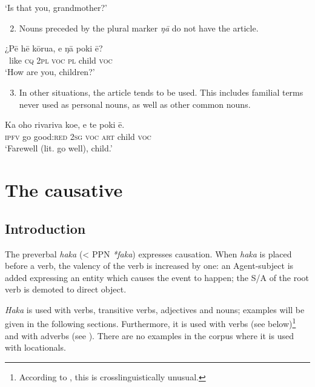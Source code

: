 \glt
‘Is that you, grandmother?’ \textstyleExampleref{[R313.119]} 
\z

\begin{enumerate}
\setcounter{enumi}{1}
\item 
Nouns preceded by the plural marker \textit{ŋā} do not have the article.
\end{enumerate}

\ea\label{ex:8.218}
\gll ¿Pē hē kōrua, e ŋā poki ē?\\
~like \textsc{cq} \textsc{2pl} \textsc{voc} \textsc{pl} child \textsc{voc}\\

\glt
‘How are you, children?’ \textstyleExampleref{[R359.007]} 
\z

\begin{enumerate}
\setcounter{enumi}{2}
\item 
In other situations, the article tends to be used. This includes familial terms never used as personal nouns, as well as other common nouns.
\end{enumerate}

\ea\label{ex:8.219}
\gll Ka oho rivariva koe, e te poki ē. \\
\textsc{ipfv} go good:\textsc{red} \textsc{2sg} \textsc{voc} \textsc{art} child \textsc{voc} \\

\glt 
‘Farewell (lit. go well), child.’ \textstyleExampleref{[R210.047]} 
\z

\section{The causative}\label{sec:8.12}
\subsection{Introduction}\label{sec:8.12.1}

The preverbal  \textit{haka} ({\textless} PPN \textit{*faka}) expresses causation. When \textit{haka} is placed before a verb, the valency of the verb is increased by one: an Agent-subject is added expressing an entity which causes the event to happen; the S/A of the root verb is demoted to direct object.

\textit{Haka} is used with  verbs, transitive verbs, adjectives and nouns; examples will be given in the following sections. Furthermore, it is used with  verbs (see  below)\footnote{\label{fn:454}According to \citet[251]{Dixon2012}, this is crosslinguistically unusual.} and with adverbs (see ). There are no examples in the corpus where it is used with locationals.

